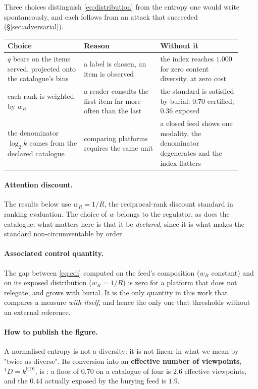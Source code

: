 \documentclass[11pt,a4paper]{article}
\begin{document}
Three choices distinguish \eqref{eq:distribution} from the entropy one would write
spontaneously, and each follows from an attack that succeeded (\S\ref{sec:adversarial}).

\begin{center}
\begin{tabular}{@{}p{0.30\linewidth}p{0.30\linewidth}p{0.32\linewidth}@{}}
\toprule
\textbf{Choice} & \textbf{Reason} & \textbf{Without it} \\
\midrule
$q$ bears on the items served, projected onto the catalogue's bins & a label is chosen, an item
is observed & the index reaches $1.000$ for zero content diversity, at zero cost \\[2mm]
each rank is weighted by $w_R$ & a reader consults the first item far more often than the last
& the standard is satisfied by burial: $0.70$ certified, $0.36$ exposed \\[2mm]
the denominator $\log_2 k$ comes from the declared catalogue & comparing platforms requires the
same unit & a closed feed shows one modality, the denominator degenerates and the index
flatters \\
\bottomrule
\end{tabular}
\end{center}

\paragraph{Attention discount.} The results below use $w_R = 1/R$, the reciprocal-rank
discount standard in ranking evaluation. The choice of $w$ belongs to the regulator, as does
the catalogue; what matters here is that it be \emph{declared}, since it is what makes the
standard non-circumventable by order.

\paragraph{Associated control quantity.} The gap between \eqref{eq:edi} computed on the feed's
composition ($w_R$ constant) and on its exposed distribution ($w_R = 1/R$) is zero for a
platform that does not relegate, and grows with burial. It is the only quantity in this work
that compares a measure \emph{with itself}, and hence the only one that thresholds without an
external reference.

\paragraph{How to publish the figure.} A normalised entropy is not a diversity: it is not linear
in what we mean by "twice as diverse". Its conversion into an \textbf{effective number of
viewpoints}, ${}^{1}\!D = k^{\mathrm{EDI}}$, is \citep{jost2006}: a floor of $0.70$ on a catalogue
of four is $2.6$ effective viewpoints, and the $0.44$ actually exposed by the burying feed is
$1.9$.
\end{document}
